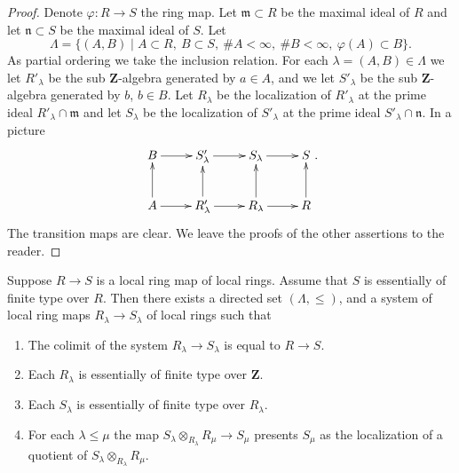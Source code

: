 \begin{proof}
Denote $\varphi : R  \to S$ the ring map.
Let $\mathfrak m \subset R$ be the maximal ideal
of $R$ and let $\mathfrak n \subset S$ be the maximal
ideal of $S$. Let
$$
\Lambda = \{
(A, B)
\mid
A \subset R, \ 
B \subset S, \ 
\# A < \infty, \ 
\# B < \infty, \ 
\varphi(A) \subset B
\}.
$$
As partial ordering we take the inclusion relation. For each
$\lambda = (A, B) \in \Lambda$ we let $R'_\lambda$ be
the sub $\mathbf{Z}$-algebra generated by
$a \in A$, and we let $S'_\lambda$ be the sub
$\mathbf{Z}$-algebra generated by $b$, $b \in B$.
Let $R_\lambda$ be the localization of $R'_\lambda$
at the prime ideal $R'_\lambda \cap \mathfrak m$ and let
$S_\lambda$ be the localization of $S'_\lambda$ at
the prime ideal $S'_\lambda \cap \mathfrak n$.
In a picture
$$
\xymatrix{
B \ar[r] &
S'_\lambda \ar[r] &
S_\lambda \ar[r] &
S \\
A \ar[r] \ar[u] &
R'_\lambda \ar[r] \ar[u] &
R_\lambda \ar[r] \ar[u] &
R \ar[u]
}.
$$
The transition maps are clear. We leave the proofs of the other
assertions to the reader.
\end{proof}

\begin{lemma}
\label{lemma-limit-essentially-finite-type}
Suppose $R \to S$ is a local ring map of local rings.
Assume that $S$ is essentially of finite type over $R$.
Then there exists a directed set $(\Lambda, \leq)$, and
a system of local ring maps $R_\lambda \to S_\lambda$
of local rings such that
\begin{enumerate}
\item The colimit of the system $R_\lambda \to S_\lambda$
is equal to $R \to S$.
\item Each $R_\lambda$ is essentially of finite type
over $\mathbf{Z}$.
\item Each $S_\lambda$ is essentially of finite type
over $R_\lambda$.
\item For each $\lambda \leq \mu$ the map
$S_\lambda \otimes_{R_\lambda} R_\mu \to S_\mu$
presents $S_\mu$ as the localization of a quotient
of $S_\lambda \otimes_{R_\lambda} R_\mu$.
\end{enumerate}
\end{lemma}

